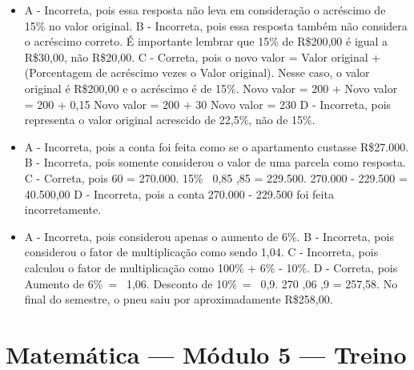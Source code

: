 \begin{itemize}
\item A - Incorreta, pois essa resposta não leva em consideração o acréscimo
de 15\% no valor original.
B - Incorreta, pois essa resposta também não considera o acréscimo
correto. É importante lembrar que 15\% de R\$200,00 é igual a R\$30,00,
não R\$20,00.
C - Correta, pois o novo valor = Valor original + (Porcentagem de
acréscimo vezes o Valor original). Nesse caso, o valor original é
R\$200,00 e o acréscimo é de 15\%. Novo valor = 200 +  Novo valor = 200 +
0,15  Novo valor = 200 + 30 Novo valor = 230
D - Incorreta, pois representa o valor original acrescido de 22,5\%, não
de 15\%.
\item A - Incorreta, pois a conta foi feita como se o apartamento custasse
R\$27.000.
B - Incorreta, pois somente considerou o valor de uma parcela como
resposta.
C - Correta, pois 60  = 270.000. 15\% \rightarrow {}\ 0,85 ,85  = 229.500. 270.000 - 229.500 = 40.500,00
D - Incorreta, pois a conta 270.000 - 229.500 foi feita
incorretamente.
\item A - Incorreta, pois considerou apenas o aumento de 6\%.
B - Incorreta, pois considerou o fator de multiplicação como sendo 1,04.
C - Incorreta, pois calculou o fator de multiplicação como 100\% + 6\% -
10\%.
D - Correta, pois Aumento de 6\%\  = \ 1,06. Desconto de 10\%\  = \ 0,9. 270 ,06 ,9 = 257,58. No final do semestre, o pneu saiu por aproximadamente R\$258,00.
\end{itemize}

\section*{Matemática — Módulo 5 — Treino}

